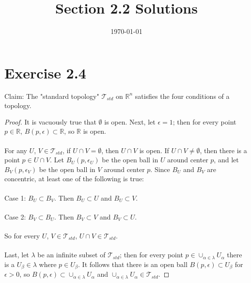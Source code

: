 \documentclass{article}
\title{\textbf{Section 2.2 Solutions}}
\date{}
\date\today
\begin{document}
\maketitle %

\thispagestyle{firstpage}
\section*{Exercise 2.4}

Claim: The "standard topology" $\mathcal{T}_{std}$ on $\mathbb{R}^n$ satisfies the four conditions of a topology.

\begin{proof}
  It is vacuously true that $\emptyset$ is open.  Next, let $\epsilon = 1$; then 
  for every point $p \in \mathbb{R}$, $B(p, \epsilon) \subset \mathbb{R}$, so $\mathbb{R}$ is open. \\ 
  \\ 
  For any $U$, $V \in \mathcal{T}_{std}$, if $U \cap V = \emptyset$, then $U \cap V$ is open.  
  If $U \cap V \neq \emptyset$, then there is a point $p \in U \cap V$.  Let 
  $B_U(p, \epsilon_U)$ be the open ball in $U$ around center $p$, and let 
  $B_V(p, \epsilon_V)$ be the open ball in $V$ around center $p$.  Since 
  $B_U$ and $B_V$ are concentric, at least one of the following is true: \\
  \\ 
  Case 1: $B_U \subset B_V$.  Then $B_U \subset U$ and $B_U \subset V$.  \\ 
  \\
  Case 2: $B_V \subset B_U$.  Then $B_V \subset V$ and $B_V \subset U$. \\ 
  \\ 
  So for every $U$, $V \in \mathcal{T}_{std}$, $U \cap V \in \mathcal{T}_{std}.$\\ 
  \\
  Last, let $\lambda$ be an infinite subset of $\mathcal{T}_{std}$; then for 
  every point $p \in \cup_{\alpha \in \lambda} U_{\alpha}$ there is a $U_{\beta} \in \lambda$ 
  where $p \in U_{\beta}$.  It follows that there is an open ball $B(p, \epsilon) \subset U_{\beta}$ 
  for $\epsilon > 0$, so $B(p, \epsilon) \subset \cup_{\alpha \in \lambda} U_{\alpha}$ and 
  $\cup_{\alpha \in \lambda} U_{\alpha} \in \mathcal{T}_{std}$.
\end{proof}
\end{document}
